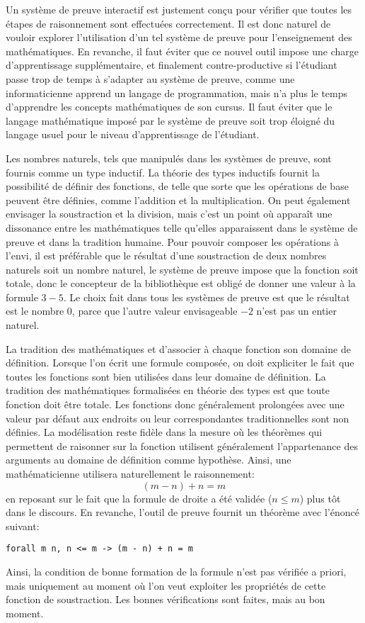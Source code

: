 \documentclass[draft]{jflart}
\begin{document}
Un système de preuve interactif est justement conçu pour vérifier que toutes
les étapes de raisonnement sont effectuées correctement.  Il est donc
naturel de vouloir explorer l'utilisation d'un tel système de preuve
pour l'enseignement des mathématiques.  En revanche, il faut éviter
que ce nouvel outil impose une charge d'apprentissage supplémentaire,
et finalement contre-productive si l'étudiant passe trop de temps à
s'adapter au système de preuve, comme une informaticienne apprend un
langage de programmation, mais n'a plus le temps d'apprendre les
concepts mathématiques de son cursus.  Il faut éviter que le langage
mathématique imposé par le système de preuve soit trop éloigné du
langage usuel pour le niveau d'apprentissage de l'étudiant.

Les nombres naturels, tels que manipulés dans les systèmes de preuve,
sont fournis comme un type inductif.  La théorie des types inductifs
fournit la possibilité de définir des fonctions, de telle que sorte
que les opérations de base peuvent être définies, comme l'addition et
la multiplication.  On peut également envisager la soustraction et la
division, mais c'est un point où apparaît une dissonance entre les
mathématiques telle qu'elles apparaissent dans le système de preuve et
dans la tradition humaine.  Pour pouvoir composer les opérations à
l'envi, il est préférable que le résultat d'une soustraction de deux
nombres naturels soit un nombre naturel, le système de preuve impose
que la fonction soit totale, donc le concepteur de la bibliothèque est
obligé de donner une valeur à la formule \(3 - 5\).  Le choix fait
dans tous les systèmes de preuve est que le résultat est le nombre
\(0\), parce que l'autre valeur envisageable \(-2\) n'est pas un
entier naturel.

La tradition des mathématiques et d'associer à chaque fonction son
domaine de définition.  Lorsque l'on écrit une formule composée, on
doit expliciter le fait que toutes les fonctions sont bien utilisées
dans leur domaine de définition.  La tradition des mathématiques
formalisées en théorie des types est que toute fonction doit être
totale.  Les fonctions donc généralement prolongées avec une valeur
par défaut aux endroits ou leur correspondantes traditionnelles sont
non définies.  La modélisation reste fidèle dans la mesure où les
théorèmes qui permettent de raisonner sur la fonction utilisent
généralement l'appartenance des arguments au domaine de définition
comme hypothèse.  Ainsi, une mathématicienne utilisera naturellement
le raisonnement:
\[(m - n) + n = m\]
en reposant sur le fait que la formule de droite a été validée (\(n
\leq m\)) plus tôt dans le discours.  En revanche, l'outil de preuve
fournit un théorème avec l'énoncé suivant:
\begin{verbatim}
forall m n, n <= m -> (m - n) + n = m
\end{verbatim}
Ainsi, la condition de bonne formation de la formule n'est pas
vérifiée a priori, mais uniquement au moment où l'on veut exploiter
les propriétés de cette fonction de soustraction.  Les bonnes
vérifications sont faites, mais au bon moment.
\end{document}
